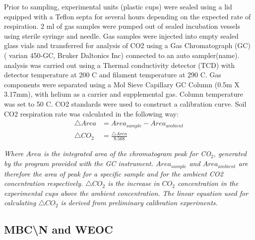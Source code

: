 \documentclass[12pt]{report}
\begin{document}
    	Prior to sampling, experimental units (plastic cups) were sealed using a lid equipped with a Teflon septa for several hours depending on the expected rate of respiration. 2 ml of gas samples were pumped out of sealed incubation vessels using sterile syringe and needle. Gas samples were injected into empty sealed glass vials and transferred for analysis of CO2 using a Gas Chromatograph (GC) ( varian 450-GC, Bruker Daltonics Inc) connected to an auto sampler(name). analysis was carried out using a Thermal conductivity detector (TCD) with detector temperature at 200 C and filament temperature at 290 C. Gas components were separated using a Mol Sieve Capillary GC Column (0.5m X 3.17mm), with helium as a carrier and supplemental gas. Column temperature was set to 50 C. CO2   standards were used to construct a calibration curve.
    	Soil CO2 respiration rate was calculated in the following way:\\
    	
   		\begin{align} %
   		\triangle Area &= Area_{sample} - Area_{ambient}\\
   		\triangle CO_2 &= \frac{\triangle Area}{8.568}
   		\end{align}

    	\begin{adjustwidth}{50pt}{50pt}
    		\begin{footnotesize}
    			\textit{Where $Area$ is the integrated area of the chromatogram peak for CO$_2$, generated by the program provided with the GC instrument. $ Area_{sample} $ and $  Area_{ambient} $ are therefore the area of peak for a specific sample and for the ambient CO2 concentration respectively.  $\triangle CO_2$  is the increase in $ CO_2 $ concentration in the experimental cups above the ambient concentration. The linear equation used for calculating  $\triangle CO_2$ is derived from preliminary calibration experiments.}
    		\end{footnotesize}
		\end{adjustwidth}    	
    
    \subsection{MBC\textbackslash{}N and WEOC}
    	
\end{document}
